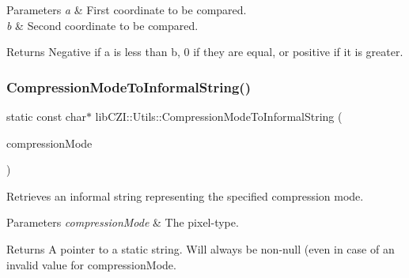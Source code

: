 \begin{DoxyParams}{Parameters}
{\em a} & First coordinate to be compared. \\
\hline
{\em b} & Second coordinate to be compared.\\
\hline
\end{DoxyParams}
\begin{DoxyReturn}{Returns}
Negative if \textquotesingle{}a\textquotesingle{} is less than \textquotesingle{}b\textquotesingle{}, 0 if they are equal, or positive if it is greater. 
\end{DoxyReturn}
\mbox{\label{classlib_c_z_i_1_1_utils_a8866b5684bec94262510d6ff12bbdb2b}} 
\subsubsection{\texorpdfstring{Compression\+Mode\+To\+Informal\+String()}{CompressionModeToInformalString()}}
{\footnotesize\ttfamily static const char$\ast$ lib\+C\+Z\+I\+::\+Utils\+::\+Compression\+Mode\+To\+Informal\+String (\begin{DoxyParamCaption}\item[{\hyperlink{namespacelib_c_z_i_a672959aa909ce27c5a549465200b08fb}{lib\+C\+Z\+I\+::\+Compression\+Mode}}]{compression\+Mode }\end{DoxyParamCaption})\hspace{0.3cm}{\ttfamily [static]}}

Retrieves an informal string representing the specified compression mode.


\begin{DoxyParams}{Parameters}
{\em compression\+Mode} & The pixel-\/type.\\
\hline
\end{DoxyParams}
\begin{DoxyReturn}{Returns}
A pointer to a static string. Will always be non-\/null (even in case of an invalid value for {\ttfamily compression\+Mode}. 
\end{DoxyReturn}
\mbox{\label{classlib_c_z_i_1_1_utils_a3814604760096f9d0bb6f292de4fdf5f}} 
